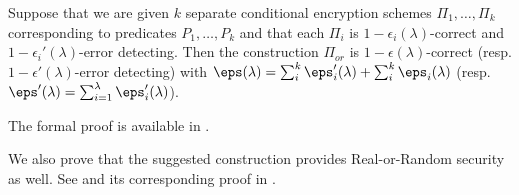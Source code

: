 \newcommand{\thmORCorrect}{Suppose that we are given $ k $ separate conditional encryption schemes $ \Pi_1, \ldots, \Pi_k $ corresponding to predicates $ P_1, \ldots, P_k $ and that each $\Pi_i$ is $1-\epsilon_i(\lambda)$-correct and $1-\epsilon_i'(\lambda)$-error detecting. Then the construction $\Pi_{or}$ is $1-\epsilon(\lambda)$-correct (resp.$1-\epsilon'(\lambda)$-error detecting) with  $\eps(\lambda) = \sum_{i}^k \eps_i'(\lambda) + \sum_{i}^k \eps_i(\lambda)$ (resp. $\eps'(\lambda) = \sum_{i=1}^\lambda\eps_i'(\lambda)$). }


\begin{theorem}{}
\thmORCorrect
\end{theorem}

The formal proof is available in . 

We also prove that the suggested construction provides Real-or-Random security as well. See  and its corresponding proof in .
